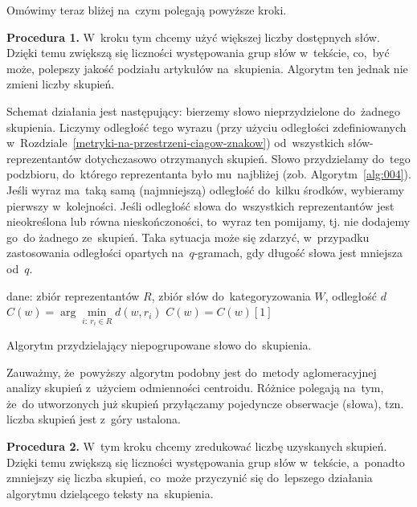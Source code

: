 \documentclass{praca1}
\begin{document}
Omówimy teraz bliżej na~czym polegają powyższe kroki.

\textbf{Procedura 1.} W~kroku tym chcemy użyć większej liczby dostępnych słów. Dzięki temu zwiększą się liczności występowania grup słów w~tekście, co,~być może, polepszy jakość podziału artykułów na~skupienia. Algorytm ten jednak nie zmieni liczby skupień. 

Schemat działania jest następujący: bierzemy słowo nieprzydzielone do~żadnego skupienia. Liczymy odległość tego wyrazu (przy użyciu odległości zdefiniowanych w~Rozdziale~\ref{metryki-na-przestrzeni-ciagow-znakow}) od~wszystkich słów-reprezentantów dotychczasowo otrzymanych skupień. Słowo przydzielamy do~tego podzbioru, do~którego reprezentanta było mu~najbliżej (zob. Algorytm~\ref{alg:004}). Jeśli wyraz ma~taką samą (najmniejszą) odległość do~kilku środków, wybieramy pierwszy w~kolejności. Jeśli odległość słowa do~wszystkich reprezentantów jest nieokreślona lub równa nieskończoności, to~wyraz ten pomijamy, tj. nie dodajemy go~do żadnego ze~skupień. Taka sytuacja może się zdarzyć, w~przypadku zastosowania odległości opartych na~$q$-gramach, gdy długość słowa jest mniejsza od~$q$.


\begin{algorithm}[h!]
\begin{algorithmic}[1]
		\State dane: zbiór reprezentantów $R$, zbiór słów do~kategoryzowania $W$, odległość $d$
            \State $C(w) = \arg \min\limits_{i:\ r_i \in R} d(w,r_i)$
            	\State $C(w) = C(w)[1]$
            \EndIf
       \EndFor
\end{algorithmic}
\caption{Algorytm przydzielający niepogrupowane słowo do~skupienia.}\label{alg:004}
\end{algorithm}

Zauważmy, że~powyższy algorytm podobny jest do~metody aglomeracyjnej analizy skupień z~użyciem odmienności centroidu. Różnice polegają na~tym, że~do utworzonych już skupień przyłączamy pojedyncze obserwacje (słowa), tzn. liczba skupień jest z~góry ustalona.

\textbf{Procedura 2.} W~tym kroku chcemy zredukować liczbę uzyskanych skupień. Dzięki temu zwiększą się liczności występowania grup słów w~tekście, a~ponadto zmniejszy się liczba skupień, co~może przyczynić się do~lepszego działania algorytmu dzielącego teksty na~skupienia.
\end{document}
